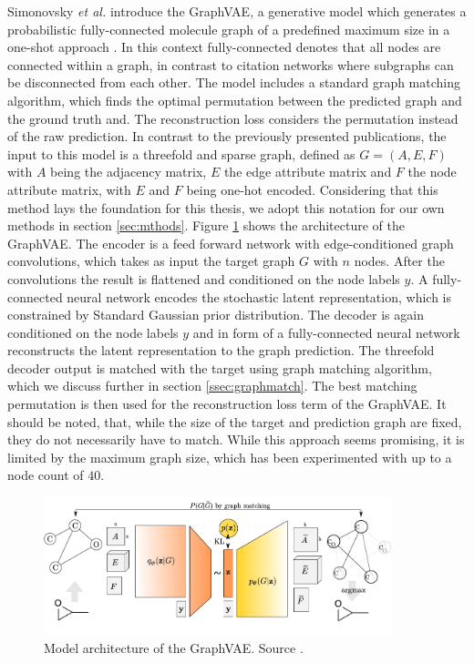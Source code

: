 Simonovsky \textit{et al.} introduce the GraphVAE, a generative model which generates a probabilistic fully-connected molecule graph of a predefined maximum size
in a one-shot approach \cite{simonovsky_graphvae_2018}. In this context fully-connected denotes that all nodes are connected within a graph, in contrast to citation networks where subgraphs can be disconnected from each other. The model includes a standard graph matching algorithm, which finds the optimal permutation between the predicted graph and the ground truth and. The reconstruction loss considers the permutation instead of the raw prediction. In contrast to the previously presented publications, the input to this model is a threefold and sparse graph, defined as $G=(A, E, F)$ with $A$ being the adjacency matrix, $E$ the edge attribute matrix and $F$ the node attribute matrix, with $E$ and $F$ being one-hot encoded. Considering that this method lays the foundation for this thesis, we adopt this notation for our own methods in section \ref{sec:mthods}. Figure \ref{fig:graphvaefull} shows the architecture of the GraphVAE. The encoder is a feed forward network with edge-conditioned graph convolutions, which takes as input the target graph $G$ with $n$ nodes. After the convolutions the result is flattened and conditioned on the node labels $y$. A fully-connected neural network encodes the stochastic latent representation, which is constrained by Standard Gaussian prior distribution. The decoder is again conditioned on the node labels $y$ and in form of a fully-connected neural network reconstructs the latent representation to the graph prediction. The threefold decoder output is matched with the target using graph matching algorithm, which we discuss further in section \ref{ssec:graphmatch}. The best matching permutation is then used for the reconstruction loss term of the GraphVAE. It should be noted, that, while the size of the target and prediction graph are fixed, they do not necessarily have to match. While this approach seems promising, it is limited by the maximum graph size, which has been experimented with up to a node count of $40$.


\begin{figure}[h]
    \centering
    \includegraphics[width=0.9\textwidth]{data/images/GraphVAEfull.png}
    \caption{Model architecture of the GraphVAE. Source \cite{simonovsky_graphvae_2018}.}
    \label{fig:graphvaefull}
\end{figure}

